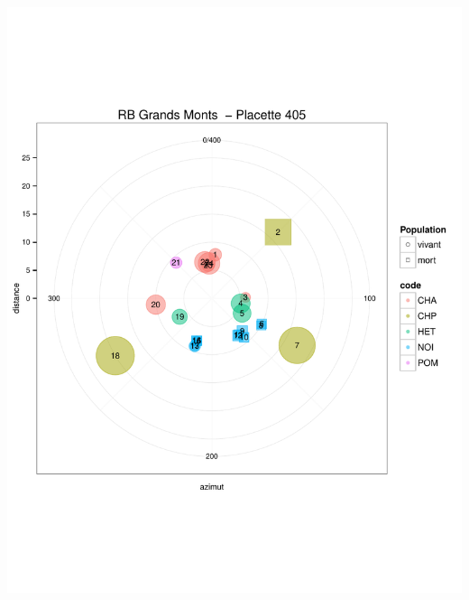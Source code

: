 \documentclass[a4paper]{book}\usepackage[]{graphicx}\usepackage[]{color}
\makeatletter
\def\maxwidth{ %
  \ifdim\Gin@nat@width>\linewidth
    \linewidth
  \else
    \Gin@nat@width
  \fi
}
\newenvironment{knitrout}{}{} %
\makeatother
\begin{document}
\begin{knitrout}
{\centering \includegraphics[width=\maxwidth]{Figures/PlanArbres-33} 

}





\end{knitrout}
\end{document}
